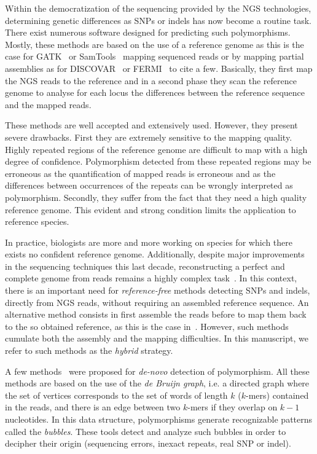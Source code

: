 \documentclass{bmcart}
\begin{document}
Within the democratization of the sequencing provided by the NGS technologies, determining genetic differences as SNPs or indels has now become a routine task.
There exist numerous software designed for predicting such polymorphisms. Mostly, these methods are based on the use of a reference genome as this is the case for GATK~\cite{gatk} or SamTools~\cite{Li2009} 
mapping sequenced reads or by mapping partial assemblies as for DISCOVAR~\cite{Weisenfeld2014} or FERMI~\cite{Li2012} to cite a few. Basically, they first map the NGS reads to the reference and in a second phase they scan the reference genome to analyse for each locus the differences between the reference sequence and the mapped reads. %

These methods are well accepted and extensively used. However, they present severe drawbacks. First they are extremely 
sensitive to the mapping quality. Highly repeated regions of the reference genome are difficult to map with a high degree of confidence.  Polymorphism detected from these repeated regions may be erroneous as the quantification of mapped reads is erroneous and as the differences between occurrences of the repeats can be wrongly interpreted as polymorphism. Secondly, they suffer from the fact that they need a high quality reference genome. This evident and strong condition limits the application to reference species. 

In practice, biologists are more and more working on species for which there exists no confident reference genome. Additionally, despite major improvements in the sequencing techniques this last decade, reconstructing a perfect and complete genome from reads remains a highly complex task~\cite{assemblathon2}. In this context, there is an important need for \emph{reference-free} methods detecting SNPs and indels, directly from NGS reads, without requiring an assembled reference sequence. An alternative method consists in first assemble the reads before to map them back to the so obtained reference, as this is the case in~\cite{Willing2011}. However, such methods cumulate both the assembly and the mapping difficulties. In this manuscript, we refer to such methods as the \emph{hybrid} strategy. 

A few methods~\cite{Peterlongo2010,iqbal2012novo,Leggett2013,Nordstrom2013,Kissplice} were proposed for \emph{de-novo} detection of polymorphism.  All these methods are based on the use of the \emph{de Bruijn graph}, i.e. a directed graph where the set of vertices corresponds to the set of words of length $k$ ($k$-mers) contained in the reads, and there is an edge between two $k$-mers if they overlap on $k-1$ nucleotides. In this data structure, polymorphisms generate recognizable patterns called the \emph{bubbles}. These tools detect and analyze such bubbles in order to decipher their origin (sequencing errors, inexact repeats, real SNP or indel). 
\end{document}

